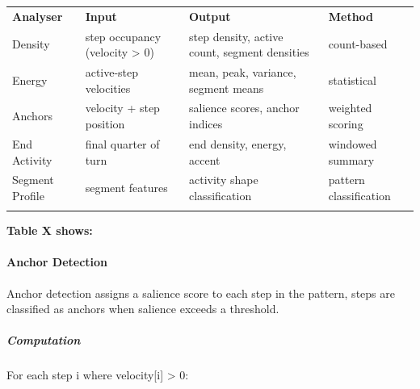 {\def\LTcaptype{none} %
\begin{longtable}[]{@{}llll@{}}
\toprule\noalign{}
\textbf{Analyser} & \textbf{Input} & \textbf{Output} &
\textbf{Method} \\
Density & step occupancy (velocity \textgreater{} 0) & step density,
active count, segment densities & count-based \\
Energy & active-step velocities & mean, peak, variance, segment means &
statistical \\
Anchors & velocity + step position & salience scores, anchor indices &
weighted scoring \\
End Activity & final quarter of turn & end density, energy, accent &
windowed summary \\
Segment Profile & segment features & activity shape classification &
pattern classification \\
\midrule\noalign{}
\endhead
\bottomrule\noalign{}
\endlastfoot
\end{longtable}
}

\textbf{Table X shows:}

\paragraph{Anchor Detection}\label{anchor-detection}

Anchor detection assigns a salience score to each step in the pattern,
steps are classified as anchors when salience exceeds a threshold.

\subparagraph{Computation}\label{computation}

For each step i where velocity{[}i{]} \textgreater{} 0:

